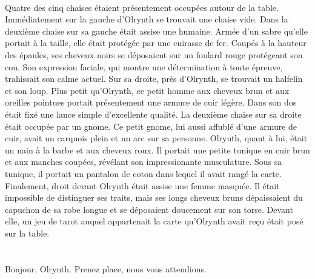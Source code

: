 \documentclass[main.tex]{subfiles}
\begin{document}
   \\
   Quatre des cinq chaises étaient présentement occupées autour de la table.
   Immédiatement sur la gauche d'Olrynth se trouvait une chaise vide.
   Dans la deuxième chaise sur sa gauche était assise une humaine.
   Armée d'un sabre qu'elle portait à la taille, elle était protégée par une cuirasse de fer.
   Coupés à la hauteur des épaules, ses cheveux noirs se déposaient sur un foulard rouge protégeant son cou.
   Son expression faciale, qui montre une détermination à toute épreuve, trahissait son calme actuel.
   Sur sa droite, près d'Olrynth, se trouvait un halfelin et son loup.
   Plus petit qu'Olrynth, ce petit homme aux cheveux brun et aux oreilles pointues portait présentement une armure de cuir légère.
   Dans son dos était fixé une lance simple d'excellente qualité.
   La deuxième chaise sur sa droite était occupée par un gnome.
   Ce petit gnome, lui aussi affublé d'une armure de cuir, avait un carquois plein et un arc sur sa personne.
   Olrynth, quant à lui, était un nain à la barbe et aux cheveux roux.
   Il portait une petite tunique en cuir brun et aux manches coupées, révélant son impressionante musculature.
   Sous sa tunique, il portait un pantalon de coton dans lequel il avait rangé la carte.
   Finalement, droit devant Olrynth était assise une femme masquée.
   Il était impossible de distinguer ses traits, mais ses longs cheveux bruns dépaissaient du capuchon de sa robe longue et se déposaient doucement sur son torse.
   Devant elle, un jeu de tarot auquel appartenait la carte qu'Olrynth avait reçu était posé sur la table.\\
   \\
   \\
   Bonjour, Olrynth.
   Prenez place, nous vous attendions.\\
\end{document}
